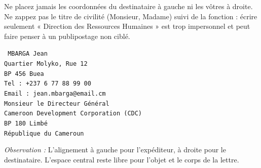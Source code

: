 \documentclass[11pt]{article}
\begin{document}
\begin{attention}
Ne placez jamais les coordonnées du destinataire à gauche ni les vôtres à droite. Ne zappez pas le titre de civilité (Monsieur, Madame) suivi de la fonction : écrire seulement « Direction des Ressources Humaines » est trop impersonnel et peut faire penser à un publipostage non ciblé.
\end{attention}

\begin{exemplebox}
\begin{flushleft}
\texttt{\small
\textsc{MBARGA} Jean\\
Quartier Molyko, Rue 12\\
BP 456 Buea\\
Tel : +237 6 77 88 99 00\\
Email : jean.mbarga@email.cm\\
\hfill Monsieur le Directeur Général\\
\hfill Cameroon Development Corporation (CDC)\\
\hfill BP 180 Limbé\\
\hfill République du Cameroun
}
\end{flushleft}
\emph{Observation :} L'alignement à gauche pour l'expéditeur, à droite pour le destinataire. L'espace central reste libre pour l'objet et le corps de la lettre.
\end{exemplebox}
\end{document}
